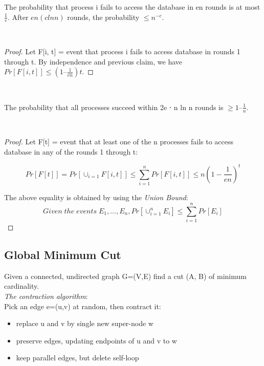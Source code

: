 \begin{claim}
    The probability that process i fails to access the database in en rounds is at most $\frac{1}{e}$. After $en (c ln n)$ rounds, the probability $\leq n^{-c}$.
\end{claim}\\

\begin{proof}
    Let F[i, t] = event that process i fails to access database in rounds 1 through t. By independence and previous claim, we have $Pr [F[i, t]] \leq (1 – \frac{1}{en}) t$.
\end{proof}\\

\begin{claim}
    The probability that all processes succeed within 2e ⋅ n ln n rounds is $\geq 1 – \frac{1}{n}$.
\end{claim}\\

\begin{proof}
    Let F[t] = event that at least one of the n processes fails to access database in any of the rounds 1 through t:

    \[Pr[F[t]]=Pr[ \cup_{i=1} F[i,t]] \leq \sum_{i=1}^{n} Pr[F[i,t]] \leq n(1−\frac{1}{en})^{t}\]

    The above equality is obtained by using the \emph{Union Bound}:
    \[Given \; the \; events \; E_{1}, ..., E_{n}, Pr[\cup_{i=1}^{n}E_{i}] \leq \sum_{i=1}^{n}Pr[E_{i}]\]

\end{proof}

\subsection{Global Minimum Cut}
Given a connected, undirected graph G=(V,E) find a cut (A, B) of minimum cardinality.\\

\emph{The contraction algorithm}:\\
Pick an edge e=(u,v) at random, then contract it:

\begin{itemize}

    \item {replace u and v by single new super-node w}\\
    \item {preserve edges, updating endpoints of u and v to w}\\
    \item{keep parallel edges, but delete self-loop}\\

\end{itemize}


